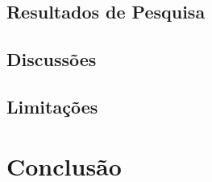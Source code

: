 \documentclass[journal]{IEEEtran}
\begin{document}
\subsection{Resultados de Pesquisa}

\subsection*{Discussões}
\subsection*{Limitações}


\section{Conclusão}




\end{document}
